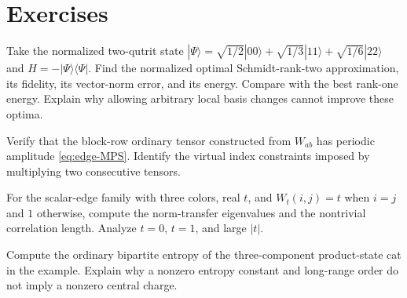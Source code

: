 \section{Exercises}

\begin{exercise}\label{ex:MPS-schmidt}
Take the normalized two-qutrit state
$|\Psi\rangle=\sqrt{1/2}|00\rangle+\sqrt{1/3}|11\rangle+
\sqrt{1/6}|22\rangle$ and $H=-|\Psi\rangle\langle\Psi|$.
Find the normalized optimal Schmidt-rank-two approximation,
its fidelity, its vector-norm error, and its energy. Compare
with the best rank-one energy. Explain why allowing arbitrary
local basis changes cannot improve these optima.

\par\smallskip{}\par
\end{exercise}
\begin{exercise}\label{ex:MPS-edge}
Verify that the block-row ordinary tensor constructed from $W_{ab}$
has periodic amplitude \eqref{eq:edge-MPS}. Identify the virtual
index constraints imposed by multiplying two consecutive tensors.

\par\smallskip{}\par
\end{exercise}
\begin{exercise}\label{ex:MPS-correlation}
For the scalar-edge family with three colors, real $t$, and
$W_t(i,j)=t$ when $i=j$ and $1$ otherwise, compute the norm-transfer
eigenvalues and the nontrivial correlation length. Analyze $t=0$,
$t=1$, and large $|t|$.

\par\smallskip{}\par
\end{exercise}
\begin{exercise}\label{ex:MPS-cat}
Compute the ordinary bipartite entropy of the three-component
product-state cat in the example. Explain why a nonzero entropy
constant and long-range order do not imply a nonzero central charge.

\par\smallskip{}\par
\end{exercise}
